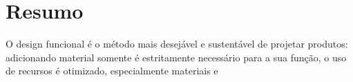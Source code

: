 \chapter*{Resumo}
%
O design funcional é o método mais desejável e sustentável de projetar
produtos: adicionando material somente é estritamente necessário para
a sua função, o uso de recursos é otimizado, especialmente materiais e

%
